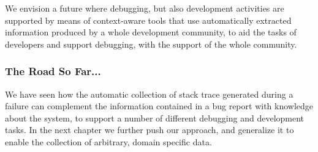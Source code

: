 We envision a future where debugging, but also development activities are supported by means of context-aware tools that use automatically extracted information produced by a whole development community, to aid the tasks of developers and support debugging, with the support of the whole community.


\subsubsection{The Road So Far...}
We have seen how the automatic collection of stack trace generated during a failure can complement the information contained in a bug report with knowledge about the system, to support a number of different debugging and development tasks.
In the next chapter we further push our approach, and generalize it to enable the collection of arbitrary, domain specific data.
